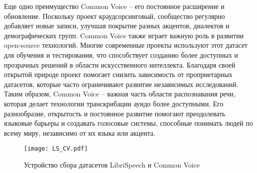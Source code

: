 Еще одно преимущество Common Voice -- его постоянное расширение и обновление. Поскольку проект краудсорсинговый, сообщество регулярно добавляет новые записи, улучшая покрытие разных акцентов, диалектов и демографических групп.
Common Voice также играет важную роль в развитии open-source технологий.
Многие современные проекты используют этот датасет для обучения и тестирования, что способствует созданию более доступных и прозрачных решений в области искусственного интеллекта.
Благодаря своей открытой природе проект помогает снизить зависимость от проприетарных датасетов, которые часто ограничивают развитие независимых исследований.
Таким образом, Common Voice -- важная часть области распознавания речи, которая делает технологии транскрибации ауидо более доступными.
Его разнообразие, открытость и постоянное развитие помогают преодолевать языковые барьеры и создавать голосовые системы, способные понимать людей по всему миру, независимо от их языка или акцента.

\begin{figure}[!t]
  \centering
  \texttt{[image: LS\_CV.pdf]}
  \caption{Устройство сбора датасетов LibriSpeech и Common Voice}
  \label{fig:ls_cv}
\end{figure}

